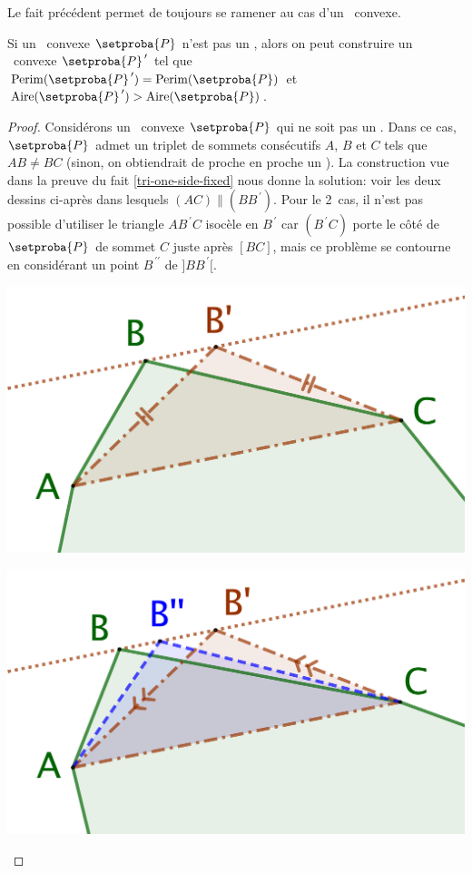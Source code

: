 \begin{remark}
	Le fait précédent permet de toujours se ramener au cas d'un \ngone\ convexe.
\end{remark}




\begin{fact} \label{iso-poly} 
	Si un \ngone\ convexe $\setproba{P}$ n'est pas un \niso, alors on peut construire un \ngone\ convexe $\setproba{P}^{\,\prime}$ tel que 
	$\perim{\setproba{P}^{\,\prime}} = \perim{\setproba{P}}$ 
	et 
	$\area{\setproba{P}^{\,\prime}} > \area{\setproba{P}}$.
\end{fact}


\begin{proof}
	Considérons un \ngone\ convexe $\setproba{P}$ qui ne soit pas un \niso.
	Dans ce cas, $\setproba{P}$ admet un triplet de sommets consécutifs $A$, $B$ et $C$ tels que $AB \neq BC$ (sinon, on obtiendrait de proche en proche un \niso).
	La construction vue dans la preuve du fait \ref{tri-one-side-fixed} nous donne la solution: voir les deux dessins ci-après dans lesquels $(AC) \parallel (BB^{\,\prime})$. 
	Pour le 2\ieme\ cas, il n'est pas possible d'utiliser le triangle $AB^{\,\prime}C$ isocèle en $B^{\,\prime}$ car $(B^{\,\prime}C)$ porte le côté de $\setproba{P}$ de sommet $C$ juste après $[BC]$, mais ce problème se contourne en considérant un point $B^{\,\prime\prime}$ de $]BB^{\,\prime}[$.
	\begin{multicols}{2}
		\centering

		\includegraphics[scale=.4]{content/polygon/not-iso-OK.png}

		\includegraphics[scale=.4]{content/polygon/not-iso-KO.png}
	\end{multicols}
	

\end{proof}
